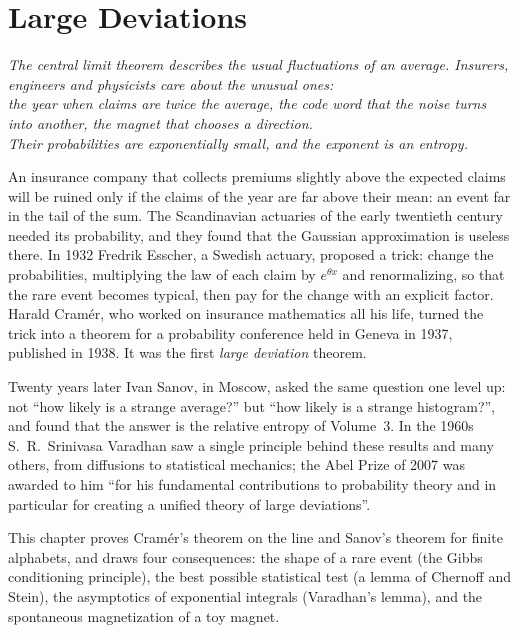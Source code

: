 \chapter{Large Deviations}
\begin{center}\itshape
The central limit theorem describes the usual fluctuations of an average. Insurers, engineers and physicists care about the unusual ones:\\
the year when claims are twice the average, the code word that the noise turns into another, the magnet that chooses a direction.\\
Their probabilities are exponentially small, and the exponent is an entropy.
\end{center}

An insurance company that collects premiums slightly above the expected claims will be ruined only if the claims of the year are far above their
mean: an event far in the tail of the sum. The Scandinavian actuaries of the early twentieth century needed its probability, and they found that the
Gaussian approximation is useless there. In 1932 Fredrik Esscher, a Swedish actuary, proposed a trick: change the probabilities, multiplying the law of each claim by
$e^{\theta x}$ and renormalizing, so that the rare event becomes typical, then pay for the change with an explicit factor. Harald Cramér, who worked on
insurance mathematics all his life, turned the trick into a theorem for a probability conference held in Geneva in 1937, published in 1938. It was the
first \emph{large deviation} theorem.

Twenty years later Ivan Sanov, in Moscow, asked the same question one level up: not ``how likely is a strange average?'' but ``how likely is a strange
histogram?'', and found that the answer is the relative entropy of Volume~3. In the 1960s S.~R.~Srinivasa Varadhan saw a single principle behind these
results and many others, from diffusions to statistical mechanics; the Abel Prize of 2007 was awarded to him ``for his fundamental contributions to
probability theory and in particular for creating a unified theory of large deviations''.

This chapter proves Cram\'er's theorem on the line and Sanov's theorem for finite alphabets, and draws four consequences: the shape of a rare event (the Gibbs
conditioning principle), the best possible statistical test (a lemma of Chernoff and Stein), the asymptotics of exponential integrals (Varadhan's lemma), and the
spontaneous magnetization of a toy magnet.

